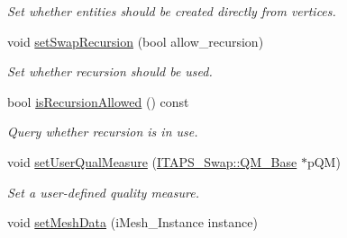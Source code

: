 \begin{DoxyCompactItemize}
\begin{DoxyCompactList}\small\item\em Set whether entities should be created directly from vertices. \item\end{DoxyCompactList}\item 
\hypertarget{class_i_t_a_p_s___swap_1_1_swap_a722719a31d50850b411b4e86f3b7fdfb}{
void \hyperlink{class_i_t_a_p_s___swap_1_1_swap_a722719a31d50850b411b4e86f3b7fdfb}{setSwapRecursion} (bool allow\_\-recursion)}
\label{class_i_t_a_p_s___swap_1_1_swap_a722719a31d50850b411b4e86f3b7fdfb}

\begin{DoxyCompactList}\small\item\em Set whether recursion should be used. \item\end{DoxyCompactList}\item 
\hypertarget{class_i_t_a_p_s___swap_1_1_swap_a69252481d8dabc89dab04f3c746a729a}{
bool \hyperlink{class_i_t_a_p_s___swap_1_1_swap_a69252481d8dabc89dab04f3c746a729a}{isRecursionAllowed} () const }
\label{class_i_t_a_p_s___swap_1_1_swap_a69252481d8dabc89dab04f3c746a729a}

\begin{DoxyCompactList}\small\item\em Query whether recursion is in use. \item\end{DoxyCompactList}\item 
\hypertarget{class_i_t_a_p_s___swap_1_1_swap_a6b19a2b25ce68389290223e5f732d077}{
void \hyperlink{class_i_t_a_p_s___swap_1_1_swap_a6b19a2b25ce68389290223e5f732d077}{setUserQualMeasure} (\hyperlink{class_i_t_a_p_s___swap_1_1_q_m___base}{ITAPS\_\-Swap::QM\_\-Base} $\ast$pQM)}
\label{class_i_t_a_p_s___swap_1_1_swap_a6b19a2b25ce68389290223e5f732d077}

\begin{DoxyCompactList}\small\item\em Set a user-\/defined quality measure. \item\end{DoxyCompactList}\item 
\hypertarget{class_i_t_a_p_s___swap_1_1_swap_abc4575a381ce0162e8e7cbae7da5ccf4}{
void \hyperlink{class_i_t_a_p_s___swap_1_1_swap_abc4575a381ce0162e8e7cbae7da5ccf4}{setMeshData} (iMesh\_\-Instance instance)}
\label{class_i_t_a_p_s___swap_1_1_swap_abc4575a381ce0162e8e7cbae7da5ccf4}


\end{DoxyCompactItemize}
